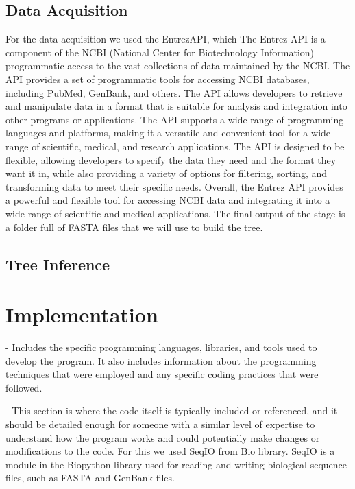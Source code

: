 \documentclass[12pt]{article}
\begin{document}
\subsection{Data Acquisition}
For the data acquisition we used the EntrezAPI, which The Entrez API is a component of the NCBI (National Center for Biotechnology Information) programmatic access to the vast collections of data maintained by the NCBI. The API provides a set of programmatic tools for accessing NCBI databases, including PubMed, GenBank, and others. The API allows developers to retrieve and manipulate data in a format that is suitable for analysis and integration into other programs or applications. The API supports a wide range of programming languages and platforms, making it a versatile and convenient tool for a wide range of scientific, medical, and research applications. The API is designed to be flexible, allowing developers to specify the data they need and the format they want it in, while also providing a variety of options for filtering, sorting, and transforming data to meet their specific needs. Overall, the Entrez API provides a powerful and flexible tool for accessing NCBI data and integrating it into a wide range of scientific and medical applications.\newline
The final output of the stage is a folder full of FASTA files that we will use to build the tree.

\subsection{Tree Inference}

\section{Implementation}\label{sec:desenvolvimentos}

- Includes the specific programming languages, libraries, and tools used to develop the program. It also includes information about the programming techniques that were employed and any specific coding practices that were followed. 

- This section is where the code itself is typically included or referenced, and it should be detailed enough for someone with a similar level of expertise to understand how the program works and could potentially make changes or modifications to the code. For this we used SeqIO from Bio library. SeqIO is a module in the Biopython library used for reading and writing biological sequence files, such as FASTA and GenBank files.
\end{document}
